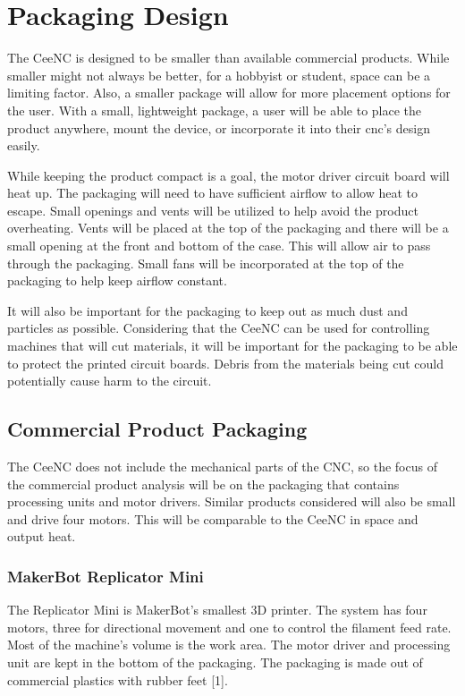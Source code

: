 \section{Packaging Design}
The CeeNC is designed to be smaller than available commercial products.
While smaller might not always be better, for a hobbyist or student, space can be a limiting factor. 
Also, a smaller package will allow for more placement options for the user. 
With a small, lightweight package, a user will be able to place the product anywhere, mount the device, or incorporate it into their \gls{cnc}'s design easily.

While keeping the product compact is a goal, the motor driver circuit board will heat up. 
The packaging will need to have sufficient airflow to allow heat to escape.
Small openings and vents will be utilized to help avoid the product overheating.
Vents will be placed at the top of the packaging and there will be a small opening at the front and bottom of the case.
This will allow air to pass through the packaging.
Small fans will be incorporated at the top of the packaging to help keep airflow constant.

It will also be important for the packaging to keep out as much dust and particles as possible.
Considering that the CeeNC can be used for controlling machines that will cut materials, it will be important for the packaging to be able to protect the printed circuit boards.
Debris from the materials being cut could potentially cause harm to the circuit.

\subsection{Commercial Product Packaging}
The CeeNC does not include the mechanical parts of the CNC, so the focus of the commercial product analysis will be on the packaging that contains processing units and motor drivers.
Similar products considered will also be small and drive four motors.
This will be comparable to the CeeNC in space and output heat.

\subsubsection{MakerBot Replicator Mini}
The Replicator Mini is MakerBot's smallest 3D printer.
The system has four motors, three for directional movement and one to control the filament feed rate.
Most of the machine's volume is the work area.
The motor driver and processing unit are kept in the bottom of the packaging.
The packaging is made out of commercial plastics with rubber feet [1].

